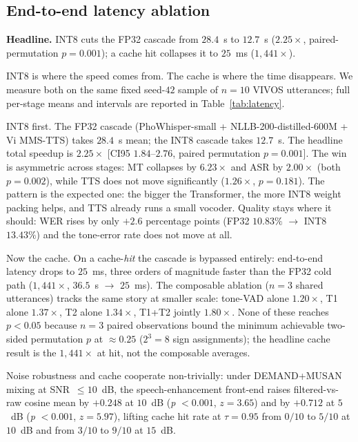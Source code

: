 \documentclass[a4paper,fleqn]{cas-dc}
\begin{document}
\subsection{End-to-end latency ablation}\label{sec:exp:latency}
\textbf{Headline.} INT8 cuts the FP32 cascade from $28.4$~s to $12.7$~s (\textbf{$2.25\times$}, paired-permutation $p=0.001$); a cache hit collapses it to $25$~ms (\textbf{$1{,}441\times$}).

INT8 is where the speed comes from. The cache is where the time disappears. We measure both on the same fixed seed-$42$ sample of $n = 10$ VIVOS utterances; full per-stage means and intervals are reported in Table~\ref{tab:latency}.

INT8 first. The FP32 cascade (PhoWhisper-small + NLLB-200-distilled-600M + Vi MMS-TTS) takes $28.4$~s mean; the INT8 cascade takes $12.7$~s. The headline total speedup is \textbf{$2.25\times$} [CI95 $1.84$--$2.76$, paired permutation $p = 0.001$]. The win is asymmetric across stages: MT collapses by $6.23\times$ and ASR by $2.00\times$ (both $p = 0.002$), while TTS does not move significantly ($1.26\times$, $p = 0.181$). The pattern is the expected one: the bigger the Transformer, the more INT8 weight packing helps, and TTS already runs a small vocoder. Quality stays where it should: WER rises by only $+2.6$ percentage points (FP32 $10.83\%$ $\rightarrow$ INT8 $13.43\%$) and the tone-error rate does not move at all.

Now the cache. On a cache-\emph{hit} the cascade is bypassed entirely: end-to-end latency drops to $25$~ms, three orders of magnitude faster than the FP32 cold path (\textbf{$1{,}441\times$}, $36.5$~s $\rightarrow$ $25$~ms). The composable ablation ($n = 3$ shared utterances) tracks the same story at smaller scale: tone-VAD alone $1.20\times$, T1 alone $1.37\times$, T2 alone $1.34\times$, T1+T2 jointly $1.80\times$. None of these reaches $p < 0.05$ because $n = 3$ paired observations bound the minimum achievable two-sided permutation $p$ at $\approx 0.25$ ($2^{3} = 8$ sign assignments); the headline cache result is the $1{,}441\times$ at hit, not the composable averages.

Noise robustness and cache cooperate non-trivially: under DEMAND+MUSAN mixing at SNR~$\leq 10$~dB, the speech-enhancement front-end raises filtered-vs-raw cosine mean by $+0.248$ at $10$~dB (\textit{p} $< 0.001$, $z = 3.65$) and by $+0.712$ at $5$~dB (\textit{p} $< 0.001$, $z = 5.97$), lifting cache hit rate at $\tau = 0.95$ from $0/10$ to $5/10$ at $10$~dB and from $3/10$ to $9/10$ at $15$~dB.
\end{document}
